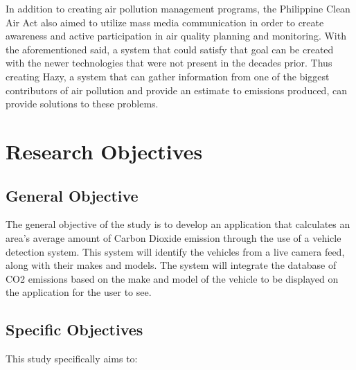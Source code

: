 In addition to creating air pollution management programs, the Philippine Clean Air Act also aimed to utilize mass media communication in order to create awareness and active participation in air quality planning and monitoring. With the aforementioned said, a system that could satisfy that goal can be created with the newer technologies that were not present in the decades prior. Thus creating Hazy, a system that can gather information from one of the biggest contributors of air pollution and provide an estimate to emissions produced, can provide solutions to these problems. 


\section{Research Objectives}
\label{sec:researchobjectives}

\subsection{General Objective}
\label{sec:generalobjective}


The general objective of the study is to develop an application that calculates an area’s average amount of Carbon Dioxide emission through the use of a vehicle detection system. This system will identify the vehicles from a live camera feed, along with their makes and models. The system will integrate the database of CO2 emissions based on the make and model of the vehicle to be displayed on the application for the user to see.



\subsection{Specific Objectives}
\label{sec:specificobjectives}

%
%
This study specifically aims to:


